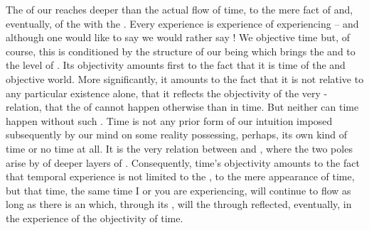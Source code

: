 %
The  of our  reaches deeper than the actual
flow of time, to the mere fact of  and, eventually, of the
 with the .  Every experience is experience of
experiencing -- and although one would like to say  we would rather
say !  We  {objective} time but, of course, this
 is conditioned by the structure of our being which brings the
 and  to the level of .  Its objectivity amounts first to the fact that it is time of
the  and objective world. More significantly, it amounts to the fact
that it is not relative to any particular existence alone, that it reflects the
objectivity of the very - relation, that the  of  cannot happen otherwise than in time.
But neither can time happen without such .  Time is not any prior
form of our intuition imposed subsequently by our mind on some reality
possessing, perhaps, its own kind of time or no time at all. It is the very
relation between  and , where the two
poles arise by  of deeper layers of .
Consequently, time's objectivity amounts to the fact that temporal experience is
not limited to the , to the mere appearance of time,
but that time, the same time I or you are experiencing, will continue to flow as
long as there is an  which, through its , will  the  through 
reflected, eventually, in the experience of the objectivity of time.


